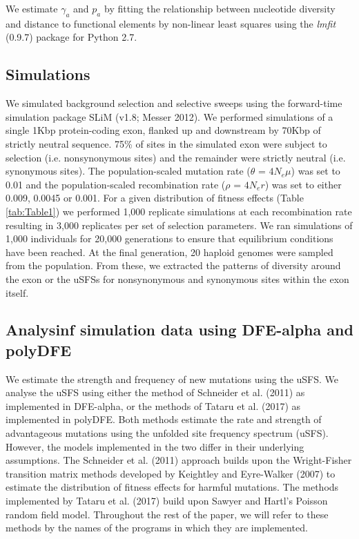 \documentclass[11pt]{article}
\begin{document}
	We estimate $\gamma_a$ and $p_a$ by fitting the relationship between nucleotide diversity and distance to functional elements by non-linear least squares using the \emph{lmfit} (0.9.7) package for Python 2.7.
 
	\subsection*{Simulations}
	We simulated background selection and selective sweeps using the forward-time simulation package SLiM (v1.8; Messer 2012). We performed simulations of a single 1Kbp protein-coding exon, flanked up and downstream by 70Kbp of strictly neutral sequence. 75\% of sites in the simulated exon were subject to selection (i.e. nonsynonymous sites) and the remainder were strictly neutral (i.e. synonymous sites). The population-scaled mutation rate ($\theta$ = \emph{$4N_{e}\mu$}) was set to 0.01 and the population-scaled recombination rate ($\rho$ = \emph{$4N_{e}r$}) was set to either 0.009, 0.0045 or 0.001. For a given distribution of fitness effects (Table \ref{tab:Table1}) we performed 1,000 replicate simulations at each recombination rate resulting in 3,000 replicates per set of selection parameters. We ran simulations of 1,000 individuals for 20,000 generations to ensure that equilibrium conditions have been reached. At the final generation, 20 haploid genomes were sampled from the population. From these, we extracted the patterns of diversity around the exon or the uSFSs for nonsynonymous and synonymous sites within the exon itself.


	\subsection*{Analysinf simulation data using DFE-alpha and polyDFE}

	We estimate the strength and frequency of new mutations using the uSFS. We analyse the uSFS using either the method of Schneider et al. (2011) as implemented in DFE-alpha, or the methods of Tataru et al. (2017) as implemented in polyDFE. Both methods estimate the rate and strength of advantageous mutations using the unfolded site frequency spectrum (uSFS). However, the models implemented in the two differ in their underlying assumptions. The Schneider et al. (2011) approach builds upon the Wright-Fisher transition matrix methods developed by Keightley and Eyre-Walker (2007) to estimate the distribution of fitness effects for harmful mutations. The methods implemented by Tataru et al. (2017) build upon Sawyer and Hartl’s Poisson random field model.
Throughout the rest of the paper, we will refer to these methods by the names of the programs in which they are implemented.
\end{document}
